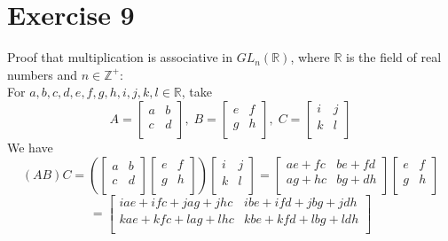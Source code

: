 \documentclass[12pt]{article}
\newcommand{\Z}{\mathbb{Z}}
\newcommand{\R}{\mathbb{R}}
\begin{document}
    \section*{Exercise 9}
    Proof that multiplication is associative in $GL_n(\R)$,
    where $\R$ is the field of real numbers and $n \in \Z^+$: \\
    For $a, b, c, d, e, f, g, h, i, j, k, l \in \R$, take
    \[ A =
    \begin{bmatrix}
    a & b \\
    c & d \\
    \end{bmatrix}, \;
    B =
    \begin{bmatrix}
    e & f \\
    g & h \\
    \end{bmatrix}, \;
    C =
    \begin{bmatrix}
    i & j \\
    k & l \\
    \end{bmatrix} \]
    We have
    \[ (AB)C =
    \left( \begin{bmatrix}
    a & b \\
    c & d \\
    \end{bmatrix}
    \begin{bmatrix}
    e & f \\
    g & h \\
    \end{bmatrix} \right)
    \begin{bmatrix}
    i & j \\
    k & l \\
    \end{bmatrix} 
    = \begin{bmatrix}
    ae + fc & be + fd \\
    ag + hc & bg + dh \\
    \end{bmatrix}
    \begin{bmatrix}
    e & f \\
    g & h \\
    \end{bmatrix} \]
    \[ = \begin{bmatrix}
    iae + ifc + jag + jhc & ibe + ifd + jbg + jdh \\
    kae + kfc + lag + lhc & kbe + kfd + lbg + ldh \\
    \end{bmatrix} \]
\end{document}
